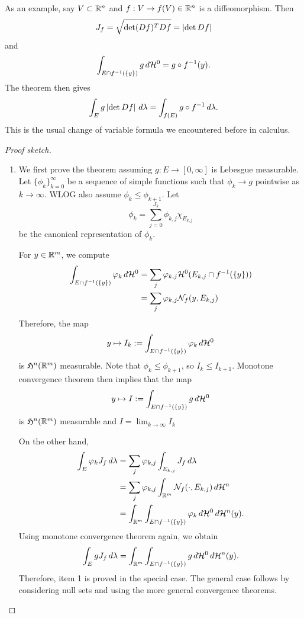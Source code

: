 \documentclass[a4paper]{article}
\renewcommand{\seqinfk}[1]{\{ #1 \}_{k=0}^\infty}
\renewcommand{\sumj}{\sum_{j=0}}
\begin{document}
\begin{eg}
  As an example, say $V \subset \mathbb{R}^n$ and $f : V \to f(V) \in \mathbb{R}^n$ is a
  diffeomorphism. Then
  \[
    J_f = \sqrt{\det (Df)^T Df} = \left\lvert \det Df\right\rvert
  \]
  and
  \[
    \int_{E \cap f^{-1}(\{y\})} g \, d \mathcal{H}^0 =
    g \circ f^{-1}(y).
  \]
  The theorem then gives
  \[
    \int_E g \left\lvert \det Df\right\rvert \, d \lambda
    = \int_{f(E)} g \circ f^{-1} \, d \lambda.
  \]
  This is the usual change of variable formula we encountered before in
  calculus.
\end{eg}

\begin{proof}[Proof sketch]
  \begin{enumerate}
    \item We first prove the theorem assuming $g : E \to [0, \infty]$ is
          Lebesgue measurable. Let $\seqinfk{\phi_k}$ be a sequence of
          simple functions such that $\phi_k \to g$ pointwise as $k \to
          \infty$. WLOG also assume $\phi_k \leq \phi_{k+1}$. Let
          \[
            \phi_k = \sumj^{J_k} \phi_{k, j} \chi_{E_{k, j}}
          \]
          be the canonical representation of $\phi_k$.

          For $y \in \mathbb{R}^m$, we compute
          \[
            \begin{aligned}
              \int_{E \cap f^{-1}(\{y\})} \varphi_k \, d \mathcal{H}^0
               & = \sum_j \varphi_{k, j} \mathcal{H}^0(E_{k, j} \cap f^{-1}(\{y\})) \\
               & = \sum_j \varphi_{k, j} \mathcal{N}_f (y, E_{k, j})
            \end{aligned}
          \]
          Therefore, the map
          \[
            y \mapsto I_k := \int_{E \cap f^{-1}(\{y\})} \varphi_k
            \, d \mathcal{H}^0
          \]
          is $\mathfrak{H}^n(\mathbb{R}^m)$ measurable. Note that $\phi_k \leq
          \phi_{k+1}$, so $I_k \leq I_{k+1}$. Monotone convergence theorem
          then implies that the map
          \[
            y \mapsto I := \int_{E \cap f^{-1}(\{y\})} g \, d \mathcal{H}^0
          \]
          is $\mathfrak{H}^n(\mathbb{R}^m)$ measurable and $I = \lim_{k \to \infty} I_k$

          On the other hand,
          \[
            \begin{aligned}
              \int_E \varphi_k J_f \, d \lambda
               & = \sum_j \varphi_{k, j} \int_{E_{k, j}} J_f \, d \lambda       \\
               & = \sum_j \varphi_{k, j} \int_{\mathbb{R}^m} \mathcal{N}_f(\cdot, E_{k, j})
              \, d \mathcal{H}^n                                                   \\
               & = \int_{\mathbb{R}^m} \int_{E \cap f^{-1}(\{y\})}
              \varphi_k \, d \mathcal{H}^0 \, d \mathcal{H}^n(y).
            \end{aligned}
          \]
          Using monotone convergence theorem again, we obtain
          \[
            \int_E g J_f \, d \lambda =
            \int_{\mathbb{R}^m} \int_{E \cap f^{-1}(\{y\})}
            g \, d \mathcal{H}^0 \, d \mathcal{H}^n (y).
          \]
          Therefore, item 1 is proved in the special case. The general
          case follows by considering null sets and using the more general
          convergence theorems.


\end{enumerate}
\end{proof}
\end{document}
